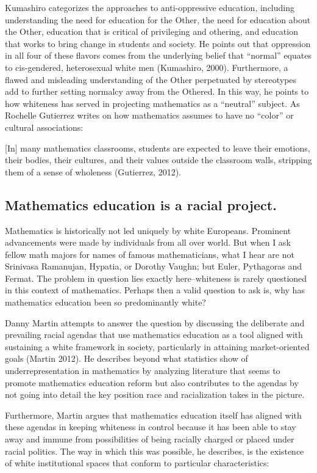 Kumashiro categorizes the approaches to anti-oppressive education, including understanding the need for education for the Other, the need for education about the Other, education that is critical of privileging and othering, and education that works to bring change in students and society. He points out that oppression in all four of these flavors comes from the underlying belief that ``normal'' equates to cis-gendered, heterosexual white men (Kumashiro, 2000). Furthermore, a flawed and misleading understanding of the Other perpetuated by stereotypes add to further setting normalcy away from the Othered. In this way, he points to how whiteness has served in projecting mathematics as a ``neutral'' subject. As Rochelle Gutierrez writes on how mathematics assumes to have no ``color'' or cultural associations:
\begin{displayquote}
  {[In]} many mathematics classrooms, students are expected to leave their emotions, their bodies, their cultures, and their values outside the classroom walls, stripping them of a sense of wholeness (Gutierrez, 2012).
\end{displayquote}

\subsection{Mathematics education is a racial project.}
Mathematics is historically not led uniquely by white Europeans. Prominent advancements were made by individuals from all over world. But when I ask fellow math majors for names of famous mathematicians, what I hear are not Srinivasa Ramanujan, Hypatia, or Dorothy Vaughn; but Euler, Pythagoras and Fermat. The problem in question lies exactly here--whiteness is rarely questioned in this context of mathematics. Perhaps then a valid question to ask is, why has mathematics education been so predominantly white?

Danny Martin attempts to answer the question by discussing the deliberate and prevailing racial agendas that use mathematics education as a tool aligned with sustaining a white framework in society, particularly in attaining market-oriented goals (Martin 2012). He describes beyond what statistics show of underrepresentation in mathematics by analyzing literature that seems to promote mathematics education reform but also contributes to the agendas by not going into detail the key position race and racialization takes in the picture.

Furthermore, Martin argues that mathematics education itself has aligned with these agendas in keeping whiteness in control because it has been able to stay away and immune from possibilities of being racially charged or placed under racial politics. The way in which this was possible, he describes, is the existence of white institutional spaces that conform to particular characteristics:

